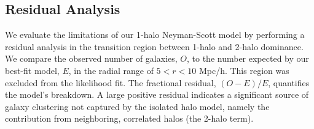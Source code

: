 \documentclass[]{article}
\begin{document}
\subsection{Residual Analysis}
We evaluate the limitations of our 1-halo Neyman-Scott model by performing a residual analysis in the transition region between 1-halo and 2-halo dominance. We compare the observed number of galaxies, $O$, to the number expected by our best-fit model, $E$, in the radial range of $5 < r < 10$ Mpc/h. This region was excluded from the likelihood fit. The fractional residual, $(O-E)/E$, quantifies the model's breakdown. A large positive residual indicates a significant source of galaxy clustering not captured by the isolated halo model, namely the contribution from neighboring, correlated halos (the 2-halo term).
\end{document}
